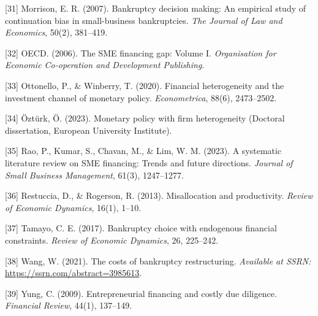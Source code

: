 \documentclass[12pt]{article}
\begin{document}
\noindent
\hangindent=0.7cm
[31] Morrison, E. R. (2007). Bankruptcy decision making: An empirical study of continuation bias in small-business bankruptcies. \textit{The Journal of Law and Economics}, 50(2), 381--419.
\vspace{3mm}

\noindent
\hangindent=0.7cm
[32] OECD. (2006). The SME financing gap: Volume I. \textit{Organisation for Economic Co-operation and Development Publishing}.
\vspace{3mm}

\noindent
\hangindent=0.7cm
[33] Ottonello, P., \& Winberry, T. (2020). Financial heterogeneity and the investment channel of monetary policy. \textit{Econometrica}, 88(6), 2473--2502.
\vspace{3mm}

\noindent
\hangindent=0.7cm
[34] Öztürk, Ö. (2023). Monetary policy with firm heterogeneity (Doctoral dissertation, European University Institute).
\vspace{3mm}

\noindent
\hangindent=0.7cm
[35] Rao, P., Kumar, S., Chavan, M., \& Lim, W. M. (2023). A systematic literature review on SME financing: Trends and future directions. \textit{Journal of Small Business Management}, 61(3), 1247--1277.
\vspace{3mm}

\noindent
\hangindent=0.7cm
[36] Restuccia, D., \& Rogerson, R. (2013). Misallocation and productivity. \textit{Review of Economic Dynamics}, 16(1), 1--10.
\vspace{3mm}

\noindent
\hangindent=0.7cm
[37] Tamayo, C. E. (2017). Bankruptcy choice with endogenous financial constraints. \textit{Review of Economic Dynamics}, 26, 225--242.
\vspace{3mm}

\noindent
\hangindent=0.7cm
[38] Wang, W. (2021). The costs of bankruptcy restructuring. \textit{Available at SSRN:} \url{https://ssrn.com/abstract=3985613}.
\vspace{3mm}

\noindent
\hangindent=0.7cm
[39] Yung, C. (2009). Entrepreneurial financing and costly due diligence. \textit{Financial Review}, 44(1), 137--149.



\newpage

\appendix

\setcounter{table}{0}
\renewcommand{\thetable}{A\arabic{table}}
\end{document}
